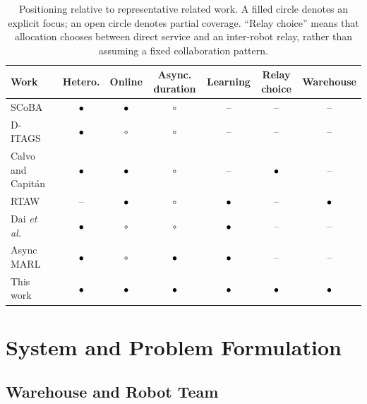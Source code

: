\documentclass[journal]{IEEEtran}
\begin{document}
\begin{table}[!t]
\centering
\caption{Positioning relative to representative related work. A filled circle denotes an explicit focus; an open circle denotes partial coverage. ``Relay choice'' means that allocation chooses between direct service and an inter-robot relay, rather than assuming a fixed collaboration pattern.}
\label{tab:related_comparison}
\footnotesize
\setlength{\tabcolsep}{3.5pt}
\begin{tabular}{lcccccc}
\toprule
Work & Hetero. & Online & Async. duration & Learning & Relay choice & Warehouse \\
\midrule
SCoBA~\cite{choudhury2022dynamic} & \textcolor{black}{$\bullet$} & \textcolor{black}{$\bullet$} & \textcolor{black}{$\circ$} & -- & -- & -- \\
D-ITAGS~\cite{neville2023ditags} & \textcolor{black}{$\bullet$} & \textcolor{black}{$\circ$} & \textcolor{black}{$\circ$} & -- & -- & -- \\
Calvo and Capit\'{a}n~\cite{calvo2025longendurance} & \textcolor{black}{$\bullet$} & \textcolor{black}{$\bullet$} & \textcolor{black}{$\circ$} & -- & \textcolor{black}{$\bullet$} & -- \\
RTAW~\cite{agrawal2023rtaw} & -- & \textcolor{black}{$\bullet$} & \textcolor{black}{$\circ$} & \textcolor{black}{$\bullet$} & -- & \textcolor{black}{$\bullet$} \\
Dai \emph{et al.}~\cite{dai2025heterogeneous} & \textcolor{black}{$\bullet$} & \textcolor{black}{$\circ$} & \textcolor{black}{$\circ$} & \textcolor{black}{$\bullet$} & -- & -- \\
Async MARL~\cite{zhang2024asynchronous} & \textcolor{black}{$\bullet$} & \textcolor{black}{$\circ$} & \textcolor{black}{$\bullet$} & \textcolor{black}{$\bullet$} & -- & -- \\
This work & \textcolor{black}{$\bullet$} & \textcolor{black}{$\bullet$} & \textcolor{black}{$\bullet$} & \textcolor{black}{$\bullet$} & \textcolor{black}{$\bullet$} & \textcolor{black}{$\bullet$} \\
\bottomrule
\end{tabular}
\end{table}

\section{System and Problem Formulation}
\label{sec:problem}

\subsection{Warehouse and Robot Team}
\end{document}
